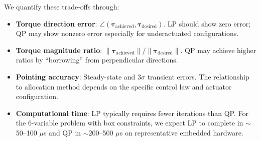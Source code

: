 \documentclass[conference]{IEEEtran}
\begin{document}
We quantify these trade-offs through:
\begin{itemize}
    \item \textbf{Torque direction error}: $\angle(\boldsymbol{\tau}_{\text{achieved}}, \boldsymbol{\tau}_{\text{desired}})$. LP should show zero error; QP may show nonzero error especially for underactuated configurations.
    \item \textbf{Torque magnitude ratio}: $\|\boldsymbol{\tau}_{\text{achieved}}\| / \|\boldsymbol{\tau}_{\text{desired}}\|$. QP may achieve higher ratios by ``borrowing'' from perpendicular directions.
    \item \textbf{Pointing accuracy}: Steady-state and 3$\sigma$ transient errors. The relationship to allocation method depends on the specific control law and actuator configuration.
    \item \textbf{Computational time}: LP typically requires fewer iterations than QP. For the 6-variable problem with box constraints, we expect LP to complete in $\sim$50--100 $\mu$s and QP in $\sim$200--500 $\mu$s on representative embedded hardware.
\end{itemize}

%
%
%
%
\end{document}
